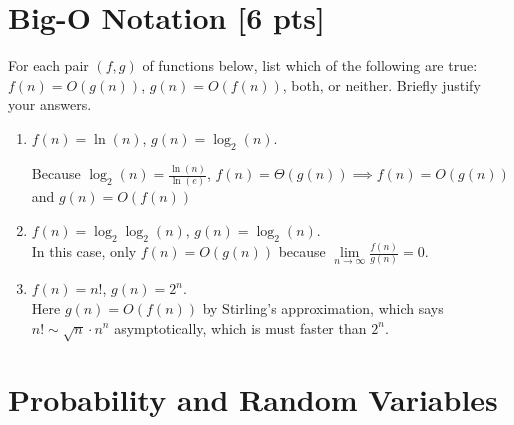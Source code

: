 \documentclass[a4paper]{article}
\theoremstyle{definition}
\newenvironment{soln}{
	\leavevmode\color{blue}\ignorespaces
}{}
\begin{document}
	
	\section{Big-O Notation [6 pts]}
	For each pair $(f, g)$ of functions below, list which of the following
	are true: $f(n) = O(g(n))$, $g(n) = O(f(n))$, both, or
	neither. Briefly justify your answers.
	\begin{enumerate}
		\item 	$f(n) = \ln(n)$, $g(n) = \log_{2}(n)$.\\
		\begin{soln}  
			Because $ \log_{2}(n) = \frac{\ln(n)}{\ln(e)} $, $ f(n) = \Theta(g(n))\implies f(n)=O(g(n)) $ and $ g(n) = O(f(n)) $
		\end{soln}
		
		\item 	$f(n) =  \log_{2}\log_{2}(n)$, $g(n) = \log_{2}(n)$.\\
		\begin{soln}  In this case, only $ f(n) = O(g(n)) $ because $ \lim\limits_{n\to\infty} \frac{f(n)}{g(n)} = 0 $. \end{soln}
		
		\item 	$f(n) = n!$, $g(n) = 2^n$.\\
		\begin{soln}  Here $ g(n) = O(f(n)) $ by Stirling's approximation, which says $ n!\sim \sqrt{n}\cdot n^n $ asymptotically, which is must faster than $ 2^n $. \end{soln}
	\end{enumerate}
	
	
	
	
	
	\section{Probability and Random Variables }
\end{document}
